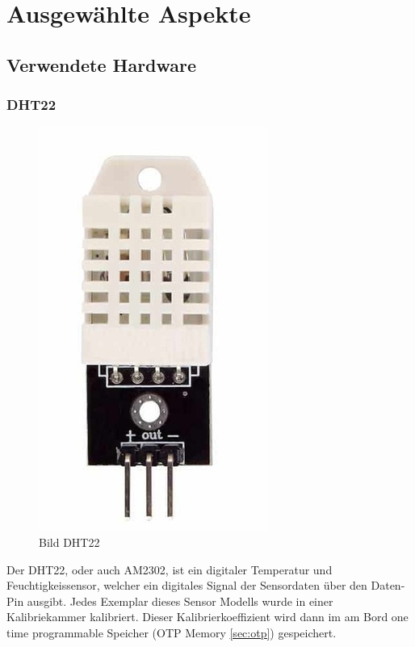 \chapter{Ausgewählte Aspekte}

\section{Verwendete Hardware}

\subsection{DHT22}

\begin{figure}[H]
    \begin{center}
        \includegraphics[scale=1]{images/dht22.png}
        \caption{Bild DHT22 \cite{dht22_picture}}
    \end{center}    
\end{figure}

Der DHT22, oder auch AM2302, ist ein digitaler Temperatur und Feuchtigkeissensor, welcher ein digitales Signal der Sensordaten über den Daten-Pin ausgibt. Jedes Exemplar dieses Sensor Modells wurde in einer Kalibriekammer kalibriert. Dieser Kalibrierkoeffizient wird dann im am Bord one time programmable Speicher (OTP Memory \ref{sec:otp}) gespeichert.
\pagebreak

